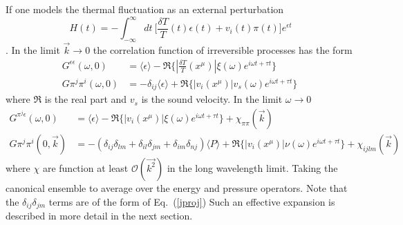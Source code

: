 \documentclass[12pt,onecolumn,showpacs,amssymb,aps,nofootinbib,floatfix]{revtex4-2}
\renewcommand{\eqref}[1]{Eq.~(\ref{#1})}
\begin{document}
	{ If one models the thermal fluctuation \cite{kadanoff} as an external perturbation \[\ H (t) =  - \int^{\infty}_{- \infty} dt \ \bigg[ \frac{\delta T}{T} (t) \epsilon (t) + v_i (t) \pi (t) \bigg]  e^{ \epsilon t}\]. In the limit $\vec{k} \rightarrow 0$  the correlation function of irreversible processes has the form 
		\begin{equation}
			\label{gepsilon}
			\begin{aligned}
				G^{\epsilon \epsilon} (\omega, 0) &= \langle \epsilon \rangle  - \Re \{ |\frac{\delta T}{T} (x^\mu)| \xi(\omega) e^{i\omega t + \tau t}  \} \\ 
				G{\pi^j \pi^i} (\omega, 0) &= - \delta_{ij} \langle \epsilon \rangle + \Re \{ |v_i (x^\mu)| v_s (\omega) e^{i\omega t + \tau t}  \}
		\end{aligned}\end{equation}
		where $\Re$ is the real part and $v_s$ is the sound velocity. In the limit $\omega \rightarrow 0$
		\begin{equation}
			\label{gpiw}
			\begin{aligned}
				G^{\pi^j \epsilon} (\omega, 0) &= \langle \epsilon \rangle  - \Re \{ |v_i (x^\mu)| \xi (\omega) e^{i\omega t + \tau t}  \} + \chi_{\pi \pi} (\vec{k}) \\ 
				G{\pi^j \pi^i} (0, \vec{k}) &= - ( \delta_{ij} \delta_{lm} + \delta_{il} \delta_{jm} + \delta_{im} \delta_{nj} )  \langle P \rangle  + \Re \{ |v_i (x^\mu)| \nu (\omega) e^{i\omega t + \tau t}  \} +\chi_{ijlm} (\vec{k})
		\end{aligned}\end{equation}
		where $\chi$ are function at least  $\mathcal{O}(\vec{k^2})$ in the long wavelength limit. Taking the canonical ensemble to average over the energy and pressure operators.  Note that the $\delta_{ij}\delta_{jm}$ terms are of the form of \eqref{jproj}}   Such an effective expansion is described in more detail in the next section.
	
\end{document}
